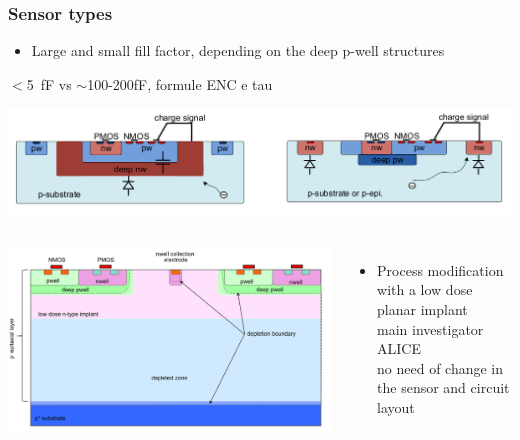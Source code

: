     \begin{frame}
        \frametitle{Sensor types}
            \begin{itemize}
                \item Large and small fill factor, depending on the deep p-well structures
            \end{itemize}
            $<$\SI{5}{fF} vs $\sim$100-200\si{fF}, formule ENC e tau

            \centering
            \includegraphics[width=.9\linewidth]{figures/Pixel_detectors/large_small_sensor_scheme.png}\\
            \begin{columns}
                    \centering
                    \includegraphics[width=0.8\linewidth]{figures/Pixel_detectors/ALPIDE_after_PM.png}
                    \begin{itemize}
                        \item Process modification with a low dose planar implant \\
                        main investigator ALICE\\
                        no need of change in the sensor and circuit layout
                    \end{itemize} 
            \end{columns}

            \end{frame} 

